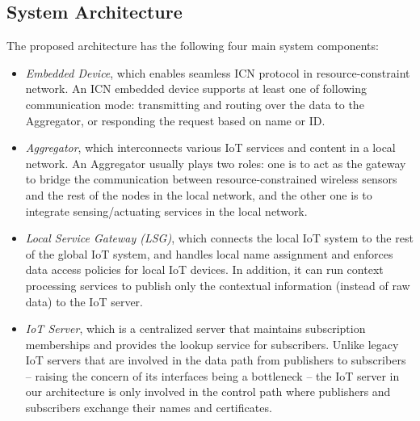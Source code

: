 \subsection{System Architecture}\label{sec:physical}

The proposed architecture has the following four main system components:
\begin{itemize}
\item{\em Embedded Device}, which enables seamless ICN protocol in resource-constraint network. An ICN embedded device supports at least one of following communication mode: transmitting and routing over the data to the Aggregator, or responding the request based on name or ID.
\item{\em Aggregator}, which interconnects various IoT services and content in a local network. An Aggregator usually plays two roles: one is to act as the gateway to bridge the communication between resource-constrained wireless sensors and the rest of the nodes in the local network,  and the other one is to integrate sensing/actuating services in the local network.


\item{\em Local Service Gateway (LSG)}, which connects the local IoT system to the rest of the global IoT system, and handles local name assignment and enforces  data access policies for local IoT devices. In addition, it can run context processing services to publish only the contextual information (instead of raw data) to the IoT server.

\item{\em IoT Server}, which is a centralized server that maintains subscription memberships and provides the lookup service for subscribers. Unlike legacy IoT servers that are involved in the data path from publishers to subscribers -- raising the concern of its interfaces being a bottleneck -- the IoT server in our architecture is only involved in the control path where publishers and subscribers exchange their names and certificates.

\end{itemize}

